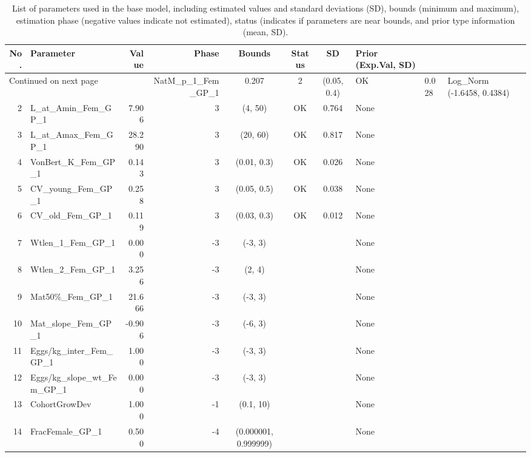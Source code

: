 \documentclass[12pt,]{article}
\begin{document}
\begin{landscape}
\begin{longtable}{rlrrcccl}
\caption{List of parameters used in
                                              the base model, including estimated 
                                              values and standard deviations (SD), 
                                              bounds (minimum and maximum), 
                                              estimation phase (negative values indicate
                                              not estimated), status (indicates if 
                                              parameters are near bounds, and prior type
                                              information (mean, SD).} \\ 
  \hline
No. & Parameter & Value & Phase & Bounds & Status & SD & Prior (Exp.Val, SD)  \\ 
  \hline 
\endhead 
\hline 
\multicolumn{3}{l}{\footnotesize Continued on next page} 
\endfoot 
\endlastfoot 
 \hline
1 & NatM\_p\_1\_Fem\_GP\_1 & 0.207 & 2 & (0.05, 0.4) & OK & 0.028 & Log\_Norm (-1.6458, 0.4384) \\ 
  2 & L\_at\_Amin\_Fem\_GP\_1 & 7.906 & 3 & (4, 50) & OK & 0.764 & None \\ 
  3 & L\_at\_Amax\_Fem\_GP\_1 & 28.290 & 3 & (20, 60) & OK & 0.817 & None \\ 
  4 & VonBert\_K\_Fem\_GP\_1 & 0.143 & 3 & (0.01, 0.3) & OK & 0.026 & None \\ 
  5 & CV\_young\_Fem\_GP\_1 & 0.258 & 3 & (0.05, 0.5) & OK & 0.038 & None \\ 
  6 & CV\_old\_Fem\_GP\_1 & 0.119 & 3 & (0.03, 0.3) & OK & 0.012 & None \\ 
  7 & Wtlen\_1\_Fem\_GP\_1 & 0.000 & -3 & (-3, 3) &  &  & None \\ 
  8 & Wtlen\_2\_Fem\_GP\_1 & 3.256 & -3 & (2, 4) &  &  & None \\ 
  9 & Mat50\%\_Fem\_GP\_1 & 21.666 & -3 & (-3, 3) &  &  & None \\ 
  10 & Mat\_slope\_Fem\_GP\_1 & -0.906 & -3 & (-6, 3) &  &  & None \\ 
  11 & Eggs/kg\_inter\_Fem\_GP\_1 & 1.000 & -3 & (-3, 3) &  &  & None \\ 
  12 & Eggs/kg\_slope\_wt\_Fem\_GP\_1 & 0.000 & -3 & (-3, 3) &  &  & None \\ 
  13 & CohortGrowDev & 1.000 & -1 & (0.1, 10) &  &  & None \\ 
  14 & FracFemale\_GP\_1 & 0.500 & -4 & (0.000001, 0.999999) &  &  & None \\ 

\end{longtable}
\end{landscape}
\end{document}

